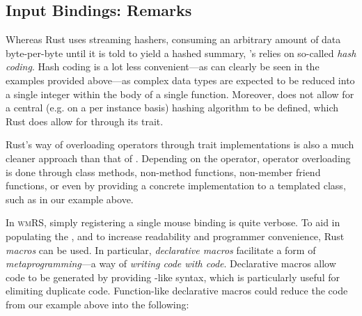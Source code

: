 \begin{cppblock}
  void
  Model::handle_mouse(MouseEvent& event)
  {
    MouseBindings& mb = this->mouse_bindings;
\end{cppblock}
\begin{cppblock}
    if (mb.cound(event.input) > 0)
      mb.at(event.input)(*this, event.window);
  }
\end{cppblock}


\subsection{Input Bindings: Remarks}

Whereas Rust uses streaming hashers, consuming an arbitrary amount of
data byte-per-byte until it is told to yield a hashed summary, \cpp{}'s
 relies on so-called \textit{hash
coding}\cite{buildingahashmap}. Hash coding is a lot less convenient---as
can clearly be seen in the examples provided above---as complex data types
are expected to be reduced into a single integer within the body of a single
function\cite{buildingahashmap}. Moreover, \cpp does not allow for a central
(e.g. on a per  instance basis) hashing algorithm to be defined,
which Rust does allow for through its  trait\cite{therustbook,
therustreference}.

Rust's way of overloading operators through trait implementations is also
a much cleaner approach than that of \cpp. Depending on the operator, \cpp
operator overloading is done through class methods, non-method functions,
non-member friend functions, or even by providing a concrete implementation to
a templated class, such as in our 
example above\cite{cppstd}.


In \textsc{wmRS}, simply registering a single mouse binding is quite verbose.
To aid in populating the , and to increase readability and
programmer convenience, Rust \textit{macros} can be used. In particular,
\textit{declarative macros} facilitate a form of \textit{metaprogramming}---a
way of \textit{writing code with code}\cite{therustbook, therustreference,
rustmacros}. Declarative macros allow code to be generated by providing
-like syntax, which is particularly useful for elimiting duplicate
code. Function-like declarative macros could reduce the code from our example
above into the following:

